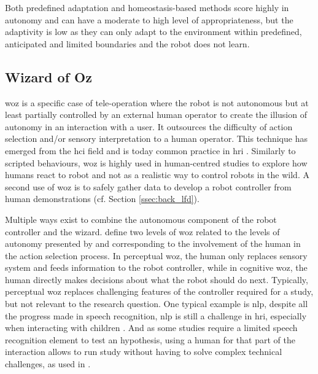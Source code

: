 	
	Both predefined adaptation and homeostasis-based methods score highly in autonomy and can have a moderate to high level of appropriateness, but the adaptivity is low as they can only adapt to the environment within predefined, anticipated and limited boundaries and the robot does not learn.

\subsection{Wizard of Oz} \label{subsec:WoZ}

	\acrfull{woz} is a specific case of tele-operation where the robot is not autonomous but at least partially controlled by an external human operator to create the illusion of autonomy in an interaction with a user. It outsources the difficulty of action selection and/or sensory interpretation to a human operator. This technique has emerged from the \gls{hci} field \citep{kelley1983empirical} and is today common practice in \gls{hri} \citep{riek2012wizard}. Similarly to scripted behaviours, \gls{woz} is highly used in human-centred studies to explore how humans react to robot and not as a realistic way to control robots in the wild. A second use of \gls{woz} is to safely gather data to develop a robot controller from human demonstrations (cf. Section \ref{ssec:back_lfd}).
	
	Multiple ways exist to combine the autonomous component of the robot controller and the wizard. \cite{baxter2016characterising} define two levels of \gls{woz} related to the levels of autonomy presented by \cite{beer2014toward} and corresponding to the involvement of the human in the action selection process. In perceptual \gls{woz}, the human only replaces sensory system and feeds information to the robot controller, while in cognitive \gls{woz}, the human directly makes decisions about what the robot should do next. Typically, perceptual \gls{woz} replaces challenging features of the controller required for a study, but not relevant to the research question. One typical example is \gls{nlp}, despite all the progress made in speech recognition, \gls{nlp} is still a challenge in \gls{hri}, especially when interacting with children \citep{kennedy2017child}. And as some studies require a limited speech recognition element to test an hypothesis, using a human for that part of the interaction allows to run study without having to solve complex technical challenges, as used in \cite{cakmak2010designing}.

